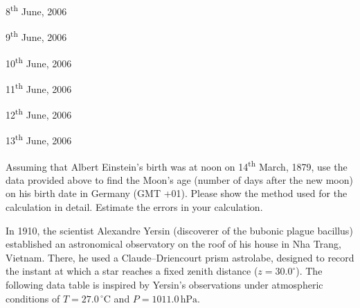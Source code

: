 \begin{center}
8\textsuperscript{th} June, 2006
\end{center}

\begin{center}
9\textsuperscript{th} June, 2006
\end{center}

\begin{center}
10\textsuperscript{th} June, 2006
\end{center}

\begin{center}
11\textsuperscript{th} June, 2006
\end{center}

\begin{center}
12\textsuperscript{th} June, 2006
\end{center}

\begin{center}
13\textsuperscript{th} June, 2006
\end{center}

Assuming that Albert Einstein's birth was at noon on 14\textsuperscript{th}
March, 1879, use the data provided above to find the Moon's age (number of days
after the new moon) on his birth date in Germany (GMT +01). Please show the
method used for the calculation in detail. Estimate the errors in your
calculation.

In 1910, the scientist Alexandre Yersin (discoverer of the bubonic plague
bacillus) established an astronomical observatory on the roof of his house in
Nha Trang, Vietnam. There, he used a Claude--Driencourt prism astrolabe,
designed to record the instant at which a star reaches a fixed zenith distance
($z = 30.0^\circ$). The following data table is inspired by Yersin's
observations under atmospheric conditions of $T = 27.0\,^\circ\mathrm{C}$ and
$P = 1011.0\,\mathrm{hPa}$.

